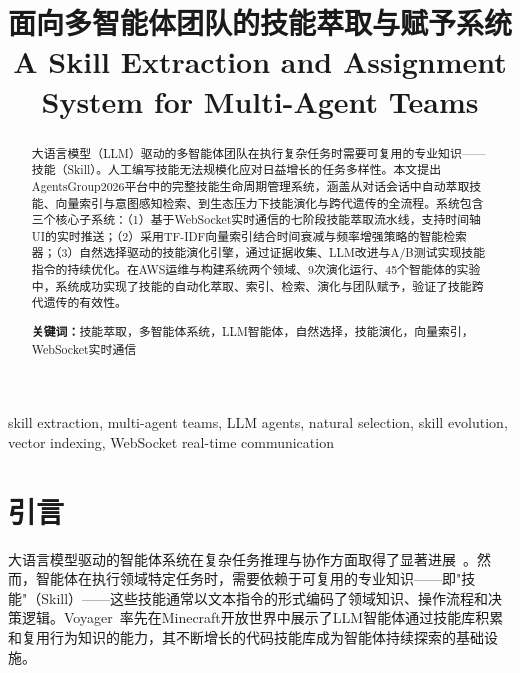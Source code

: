 \documentclass[conference]{IEEEtran}
\begin{document}
\title{面向多智能体团队的技能萃取与赋予系统\\
\large{A Skill Extraction and Assignment System for Multi-Agent Teams}}

\author{}
\maketitle

\begin{abstract}
大语言模型（LLM）驱动的多智能体团队在执行复杂任务时需要可复用的专业知识——技能（Skill）。人工编写技能无法规模化应对日益增长的任务多样性。本文提出AgentsGroup2026平台中的完整技能生命周期管理系统，涵盖从对话会话中自动萃取技能、向量索引与意图感知检索、到生态压力下技能演化与跨代遗传的全流程。系统包含三个核心子系统：（1）基于WebSocket实时通信的七阶段技能萃取流水线，支持时间轴UI的实时推送；（2）采用TF-IDF向量索引结合时间衰减与频率增强策略的智能检索器；（3）自然选择驱动的技能演化引擎，通过证据收集、LLM改进与A/B测试实现技能指令的持续优化。在AWS运维与构建系统两个领域、9次演化运行、45个智能体的实验中，系统成功实现了技能的自动化萃取、索引、检索、演化与团队赋予，验证了技能跨代遗传的有效性。

\smallskip
\noindent\textbf{关键词：}技能萃取，多智能体系统，LLM智能体，自然选择，技能演化，向量索引，WebSocket实时通信
\end{abstract}

\begin{IEEEkeywords}
skill extraction, multi-agent teams, LLM agents, natural selection, skill evolution, vector indexing, WebSocket real-time communication
\end{IEEEkeywords}

\section{引言}

大语言模型驱动的智能体系统在复杂任务推理与协作方面取得了显著进展~\cite{wu2023autogen,hong2023metagpt,park2023generative}。然而，智能体在执行领域特定任务时，需要依赖于可复用的专业知识——即"技能"（Skill）——这些技能通常以文本指令的形式编码了领域知识、操作流程和决策逻辑。Voyager~\cite{wang2023voyager}率先在Minecraft开放世界中展示了LLM智能体通过技能库积累和复用行为知识的能力，其不断增长的代码技能库成为智能体持续探索的基础设施。
\end{document}
